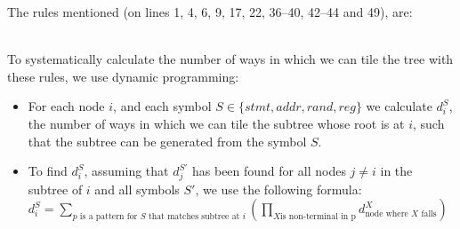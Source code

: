 The rules mentioned (on lines 1, 4, 6, 9, 17, 22, 36–40, 42–44 and 49), are:


\leavevmode
\\

To systematically calculate the number of ways in which we can tile the tree with these rules, we use dynamic programming:
\begin{itemize}
\item For each node $i$, and each symbol $S \in \{ stmt, addr, rand, reg \}$ we calculate $d_i^S$, the number of ways in which we can tile the subtree whose root is at $i$, such that the subtree can be generated from the symbol $S$.
\item To find $d_i^S$, assuming that $d_j^{S'}$ has been found for all nodes $j \ne i$ in the subtree of $i$ and all symbols $S'$, we use the following formula: \\
    $d_i^S = \sum\limits_{p\text{ is a pattern for } S \text { that matches subtree at } i} (\prod\limits_{X \text{is non-terminal in p}} d_{\text{node where } X \text{ falls}}^X)$
\end{itemize}
\leavevmode
\par

